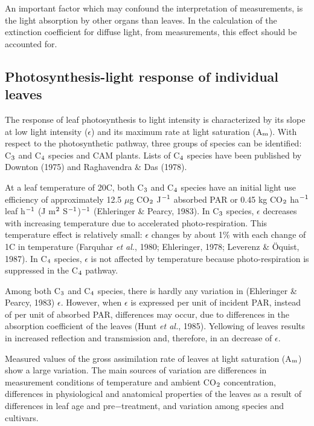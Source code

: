 An important factor which may confound the interpretation of measurements, is the light absorption by other organs than leaves. In the calculation of the extinction coefficient for diffuse light, from measurements, this effect should be accounted for.

\subsection{Photosynthesis-light response of individual leaves} 

The response of leaf photosynthesis to light intensity is characterized by its slope at low light intensity ($\epsilon$) and its maximum rate at light saturation (A$_{{\rm m}}$). With respect to the photosynthetic pathway, three groups of species can be identified: C$_{{\rm 3}}$ and C$_{{\rm 4}}$ species and CAM plants. Lists of C$_{{\rm 4}}$ species have been published by Downton (1975) and Raghavendra \& Das (1978).   

At a leaf temperature of 20\degrees C, both C$_{{\rm 3}}$ and C$_{{\rm 4}}$ species have an initial light use efficiency of approximately 12.5 $\mu$g CO$_{{\rm 2}}$ J$^{{\rm -1}}$ absorbed PAR or 0.45 kg CO$_{{\rm 2}}$ ha$^{{\rm -}{1}}$ leaf h$^{{\rm -}{1}}$ (J m$^{{\rm 2}}$ S$^{{\rm -}{1}}$)$^{{\rm -}{1}}$ (Ehleringer \& Pearcy, 1983). In C$_{{\rm 3}}$ species, $\epsilon$ decreases with increasing temperature due to accelerated photo-respiration. This temperature effect is relatively small: $\epsilon$ changes by about 1\% with each change of 1\degrees C in temperature (Farquhar {\it et al.}, 1980; Ehleringer, 1978; Leverenz \& \"{O}quist, 1987). In C$_{{\rm 4}}$ species, $\epsilon$ is not affected by temperature because photo-respiration is suppressed in the C$_{{\rm 4}}$ pathway. 

Among both C$_{{\rm 3}}$ and C$_{{\rm 4}}$ species, there is hardly any variation in (Ehleringer \& Pearcy, 1983) $\epsilon$. However, when $\epsilon$ is expressed per unit of incident PAR, instead of per unit of absorbed PAR, differences may occur, due to differences in the absorption coefficient of the leaves (Hunt {\it et al.}, 1985). Yellowing of leaves results in increased reflection and transmission and, therefore, in an decrease of $\epsilon$.  

Measured values of the gross assimilation rate of leaves at light saturation (A$_{{\rm m}}$) show a large variation. The main sources of variation are differences in measurement conditions of temperature and ambient CO$_{{\rm 2}}$ concentration, differences in physiological and anatomical properties of the leaves as a result of differences in leaf age and pre$-$treatment, and variation among species and cultivars.

